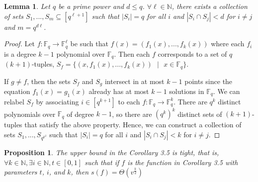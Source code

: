 \documentclass[psamsfonts]{amsart}
\newtheorem{prop}[theorem]{Proposition}
\newtheorem{lem}[theorem]{Lemma}
\theoremstyle{definition}
\theoremstyle{remark}
\numberwithin{equation}{section}
\begin{document}
	\begin{lem}
		Let $q$ be a prime power and $d \leq q$. $\forall\ell\in\mathbb{N}$, there exists a collection of sets $S_1, ..., S_m \subseteq [q^{\ell+1}]$ such that $|S_i| = q$ for all $i$ and $|S_i \cap S_j| < d$ for $i \neq j$ and $m = q^{d\ell}$.
	\end{lem}
	\begin{proof}
		Let $f : \mathbb{F}_q \rightarrow \mathbb{F}^\ell_q$ be such that $f(x) = (f_1(x), ... ,f_k(x))$ where each $f_i$ is a degree $k-1$ polynomial over $\mathbb{F}_q$. Then each $f$ corresponds to a set of $q$ $(k+1)$-tuples, $S_f = \{(x,f_1(x),...,f_k(x))\text{ }  |\text{ } x \in \mathbb{F}_q\}$. 

		If $g \neq f$, then the sets $S_f$ and $S_g$ intersect in at most $k-1$ points since the equation $f_1(x) = g_1(x)$ already has at most $k-1$ solutions in $\mathbb{F}_q$. We can relabel $S_f$ by associating $i \in [q^{k+1}]$ to each $f : \mathbb{F}_q \rightarrow \mathbb{F}^k_q$. There are $q^k$ distinct polynomials over $\mathbb{F}_q$ of degree $k-1$, so there are $(q^k)^k$ distinct sets of $(k+1)$-tuples that satisfy the above property. Hence, we can construct a collection of sets $S_1, ..., S_{q^{k^2}}$ such that $|S_i| = q$ for all $i$ and $|S_i \cap S_j| < k$ for $i \neq j$.
	\end{proof}
	\begin{prop}
		The upper bound in the Corollary 3.5 is tight, that is, $\forall k \in \mathbb{N}, \exists i\in\mathbb{N},t\in[0,1]$ such that if $f$ is the function in Corollary 3.5 with parameters
	$t$, $i$, and $k$, then $s(f)=\Theta(v^\frac{k}{2})$
	\end{prop}
\end{document}
